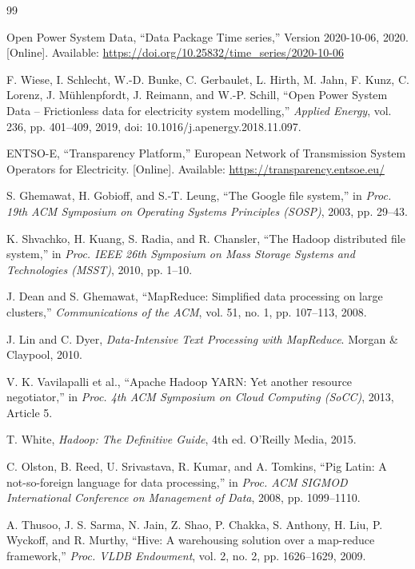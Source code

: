 \documentclass[12pt,a4paper]{report}
\begin{document}
\begin{thebibliography}{99}

 Open Power System Data, ``Data Package Time series,'' Version 2020-10-06, 2020. [Online]. Available: \url{https://doi.org/10.25832/time_series/2020-10-06}

 F. Wiese, I. Schlecht, W.-D. Bunke, C. Gerbaulet, L. Hirth, M. Jahn, F. Kunz, C. Lorenz, J. M\"uhlenpfordt, J. Reimann, and W.-P. Schill, ``Open Power System Data -- Frictionless data for electricity system modelling,'' \emph{Applied Energy}, vol. 236, pp. 401--409, 2019, doi: 10.1016/j.apenergy.2018.11.097.

 ENTSO-E, ``Transparency Platform,'' European Network of Transmission System Operators for Electricity. [Online]. Available: \url{https://transparency.entsoe.eu/}

 S. Ghemawat, H. Gobioff, and S.-T. Leung, ``The Google file system,'' in \emph{Proc. 19th ACM Symposium on Operating Systems Principles (SOSP)}, 2003, pp. 29--43.

 K. Shvachko, H. Kuang, S. Radia, and R. Chansler, ``The Hadoop distributed file system,'' in \emph{Proc. IEEE 26th Symposium on Mass Storage Systems and Technologies (MSST)}, 2010, pp. 1--10.

 J. Dean and S. Ghemawat, ``MapReduce: Simplified data processing on large clusters,'' \emph{Communications of the ACM}, vol. 51, no. 1, pp. 107--113, 2008.

 J. Lin and C. Dyer, \emph{Data-Intensive Text Processing with MapReduce}. Morgan \& Claypool, 2010.

 V. K. Vavilapalli et al., ``Apache Hadoop YARN: Yet another resource negotiator,'' in \emph{Proc. 4th ACM Symposium on Cloud Computing (SoCC)}, 2013, Article 5.

 T. White, \emph{Hadoop: The Definitive Guide}, 4th ed. O'Reilly Media, 2015.

 C. Olston, B. Reed, U. Srivastava, R. Kumar, and A. Tomkins, ``Pig Latin: A not-so-foreign language for data processing,'' in \emph{Proc. ACM SIGMOD International Conference on Management of Data}, 2008, pp. 1099--1110.

 A. Thusoo, J. S. Sarma, N. Jain, Z. Shao, P. Chakka, S. Anthony, H. Liu, P. Wyckoff, and R. Murthy, ``Hive: A warehousing solution over a map-reduce framework,'' \emph{Proc. VLDB Endowment}, vol. 2, no. 2, pp. 1626--1629, 2009.


\end{thebibliography}
\end{document}
